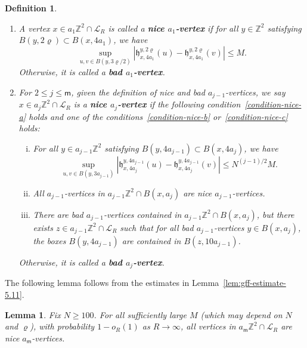 \documentclass[a4paper]{article}
\numberwithin{equation}{section}
\newtheorem{lemma}[theorem]{Lemma}
\newtheorem{definition}[theorem]{Definition}
\numberwithin{equation}{section}
\renewcommand{\1}{\mathbf{1}}
\begin{document}
\begin{definition}\label{def:nice-boxes}
    \begin{enumerate}[(1)]
        \item \label{condition-1} A vertex $x \in a_1 \mathbb{Z}^2 \cap \mathscr{L}_R$ is called a \textbf{nice $a_1$-vertex} if for all $y \in \mathbb{Z}^2$ satisfying $B(y, 2\varrho) \subset B(x, 4a_1)$, we have
        $$
        \sup_{u,v \in B(y,3\varrho/2)} |\mathfrak h^{y,2\varrho}_{x,4a_1}(u) - \mathfrak h^{y,2\varrho}_{x,4a_1}(v)| \leq M.
        $$
        Otherwise, it is called a \textbf{bad $a_1$-vertex}.
        \item For $2 \leq j \leq \mathsf{m}$, given the definition of nice and bad $a_{j-1}$-vertices, we say $x \in a_j \mathbb{Z}^2 \cap \mathscr{L}_R$ is a \textbf{nice $a_j$-vertex} if the following condition~\eqref{condition-nice-a} holds and one of the conditions~\eqref{condition-nice-b} or~\eqref{condition-nice-c} holds:
        \begin{enumerate}[(i)]
            \item \label{condition-nice-a} For all $y \in a_{j-1} \mathbb{Z}^2$ satisfying $B(y, 4a_{j-1}) \subset B(x, 4a_j)$, we have
            $$
            \sup_{u,v \in B(y,3a_{j-1})} |\mathfrak h^{y,4a_{j-1}}_{x, 4a_j}(u) - \mathfrak h^{y,4a_{j-1}}_{x, 4a_j}(v)| \leq N^{(j-1)/2} M.
            $$
            \item \label{condition-nice-b} All $a_{j-1}$-vertices in $a_{j-1} \mathbb{Z}^2 \cap B(x, a_j)$ are nice $a_{j-1}$-vertices.
        
            \item \label{condition-nice-c} There are bad $a_{j-1}$-vertices contained in $a_{j-1} \mathbb{Z}^2 \cap B(x, a_j)$, but there exists $z \in a_{j-1} \mathbb{Z}^2 \cap \mathscr{L}_R$ such that for all bad $a_{j-1}$-vertices $y \in B(x, a_j)$, the boxes $B(y, 4a_{j-1})$ are contained in $B(z, 10a_{j-1})$.
        \end{enumerate}
        Otherwise, it is called a \textbf{bad $a_j$-vertex}.
    \end{enumerate}
\end{definition}

The following lemma follows from the estimates in Lemma~\ref{lem:gff-estimate-5.11}.

\begin{lemma}\label{lem:good}
    Fix $N \geq 100$. For all sufficiently large $M$ (which may depend on $N$ and $\varrho$), with probability $1 - o_R(1)$ as $R \to \infty$, all vertices in $a_{\mathsf m} \mathbb{Z}^2 \cap \mathscr{L}_R$ are nice $a_{\mathsf m}$-vertices.
\end{lemma}
\end{document}
